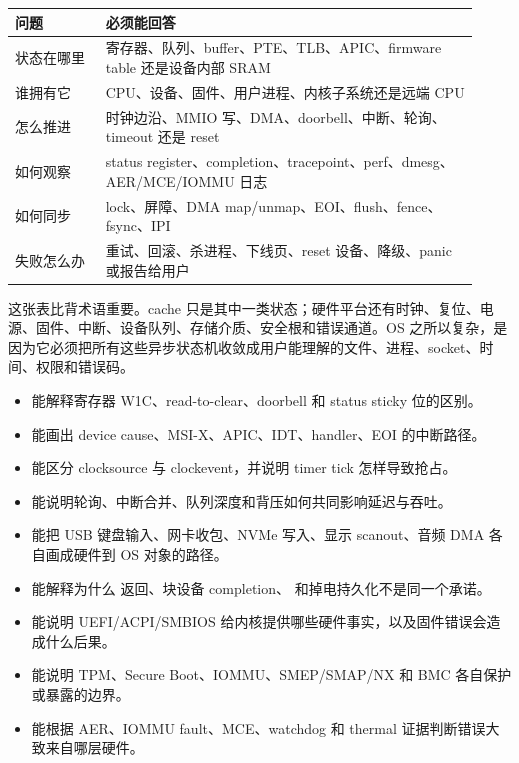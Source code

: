 \begin{longtable}{p{0.18\linewidth}p{0.74\linewidth}}
\toprule
问题 & 必须能回答 \\
\midrule
状态在哪里 & 寄存器、队列、buffer、PTE、TLB、APIC、firmware table 还是设备内部 SRAM \\
谁拥有它 & CPU、设备、固件、用户进程、内核子系统还是远端 CPU \\
怎么推进 & 时钟边沿、MMIO 写、DMA、doorbell、中断、轮询、timeout 还是 reset \\
如何观察 & status register、completion、tracepoint、perf、dmesg、AER/MCE/IOMMU 日志 \\
如何同步 & lock、屏障、DMA map/unmap、EOI、flush、fence、fsync、IPI \\
失败怎么办 & 重试、回滚、杀进程、下线页、reset 设备、降级、panic 或报告给用户 \\
\bottomrule
\end{longtable}

这张表比背术语重要。cache 只是其中一类状态；硬件平台还有时钟、复位、电源、固件、中断、设备队列、存储介质、安全根和错误通道。OS 之所以复杂，是因为它必须把所有这些异步状态机收敛成用户能理解的文件、进程、socket、时间、权限和错误码。

\begin{rubricbox}
\begin{itemize}
\tightlist
\item 能解释寄存器 W1C、read-to-clear、doorbell 和 status sticky 位的区别。
\item 能画出 device cause、MSI-X、APIC、IDT、handler、EOI 的中断路径。
\item 能区分 clocksource 与 clockevent，并说明 timer tick 怎样导致抢占。
\item 能说明轮询、中断合并、队列深度和背压如何共同影响延迟与吞吐。
\item 能把 USB 键盘输入、网卡收包、NVMe 写入、显示 scanout、音频 DMA 各自画成硬件到 OS 对象的路径。
\item 能解释为什么  返回、块设备 completion、 和掉电持久化不是同一个承诺。
\item 能说明 UEFI/ACPI/SMBIOS 给内核提供哪些硬件事实，以及固件错误会造成什么后果。
\item 能说明 TPM、Secure Boot、IOMMU、SMEP/SMAP/NX 和 BMC 各自保护或暴露的边界。
\item 能根据 AER、IOMMU fault、MCE、watchdog 和 thermal 证据判断错误大致来自哪层硬件。
\end{itemize}
\end{rubricbox}

